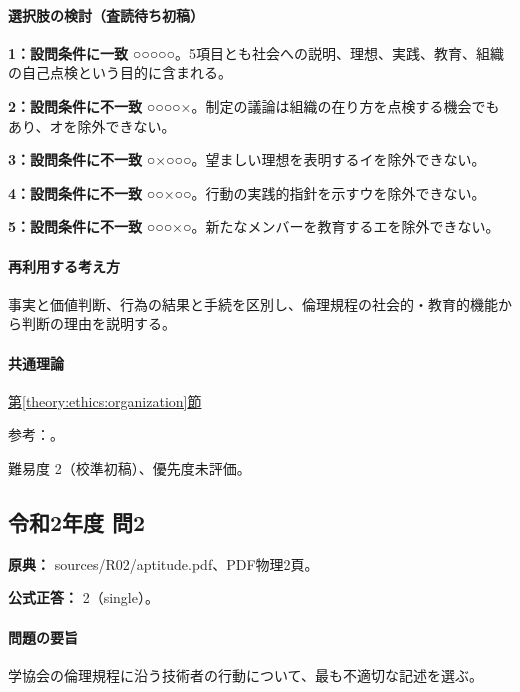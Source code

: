 \paragraph{選択肢の検討（査読待ち初稿）}\mbox{}\par

\noindent\textbf{1：設問条件に一致} ○○○○○。5項目とも社会への説明、理想、実践、教育、組織の自己点検という目的に含まれる。\par

\noindent\textbf{2：設問条件に不一致} ○○○○×。制定の議論は組織の在り方を点検する機会でもあり、オを除外できない。\par

\noindent\textbf{3：設問条件に不一致} ○×○○○。望ましい理想を表明するイを除外できない。\par

\noindent\textbf{4：設問条件に不一致} ○○×○○。行動の実践的指針を示すウを除外できない。\par

\noindent\textbf{5：設問条件に不一致} ○○○×○。新たなメンバーを教育するエを除外できない。\par

\paragraph{再利用する考え方} 事実と価値判断、行為の結果と手続を区別し、倫理規程の社会的・教育的機能から判断の理由を説明する。

\paragraph{共通理論} \hyperref[theory:ethics:organization]{第\ref*{theory:ethics:organization}節}

\par 参考：\cite{fudano_ethics2021}。

\par 難易度 2（校準初稿）、優先度未評価。

\subsection{令和2年度 問2}
\label{q:r02-reg-apt-02}

\noindent\textbf{原典：} sources/R02/aptitude.pdf、PDF物理2頁。

\textbf{公式正答：} 2（single）。

\paragraph{問題の要旨} 学協会の倫理規程に沿う技術者の行動について、最も不適切な記述を選ぶ。

